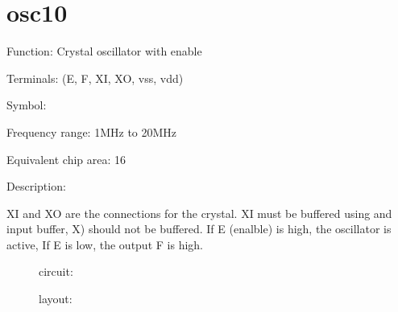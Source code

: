 \section{osc10}

Function: Crystal oscillator with enable

Terminals: (E, F, XI, XO, vss, vdd)


Symbol:
\begin{figure}[bth]
\end{figure}

Frequency range: 1MHz to 20MHz

Equivalent chip area: 16



Description:

XI and XO are the connections for the crystal.
XI must be buffered using and input buffer, X) should not be buffered.
If E (enalble) is high, the oscillator is active, If E is low, the output F is
high.  

\clearpage

\begin{figure}[bht]
circuit:\\

\end{figure}

\vspace{1cm}

\begin{figure}[bht]
layout:\\

\end{figure}




